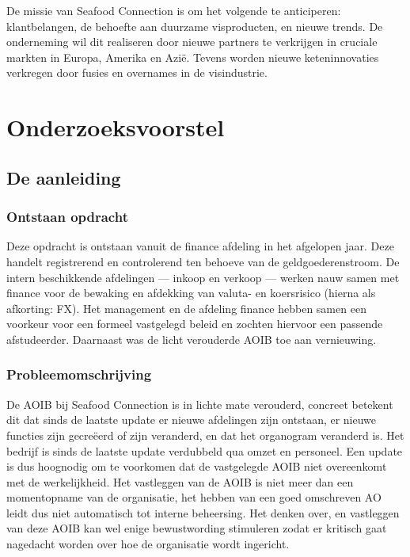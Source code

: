 \documentclass[10pt,a4paper,oneside]{report}
\begin{document}
De missie van Seafood Connection is om het volgende te anticiperen: klantbelangen, de behoefte aan duurzame visproducten, en nieuwe trends. De onderneming wil dit realiseren door nieuwe partners te verkrijgen in cruciale markten in Europa, Amerika en Azië. Tevens worden nieuwe keteninnovaties verkregen door fusies en overnames in de visindustrie. \citep{sfcwebsite}

\chapter{Onderzoeksvoorstel}
    \section{De aanleiding}

\subsection{Ontstaan opdracht}
Deze opdracht is ontstaan vanuit de finance afdeling in het afgelopen jaar. Deze handelt registrerend en controlerend ten behoeve van de geldgoederenstroom. De intern beschikkende afdelingen –-- inkoop en verkoop --– werken nauw samen met finance voor de bewaking en afdekking van valuta- en koersrisico (hierna als afkorting: FX). Het management en de afdeling finance hebben samen een voorkeur voor een formeel vastgelegd beleid en zochten hiervoor een passende afstudeerder. Daarnaast was de licht verouderde AOIB toe aan vernieuwing.

\subsection{Probleemomschrijving} \label{beschr:problemen}
De AOIB bij Seafood Connection is in lichte mate verouderd, concreet betekent dit dat sinds de laatste update er nieuwe afdelingen zijn ontstaan, er nieuwe functies zijn gecreëerd of zijn veranderd, en dat het organogram veranderd is. Het bedrijf is sinds de laatste update verdubbeld qua omzet en personeel. Een update is dus hoognodig om te voorkomen dat de vastgelegde AOIB niet overeenkomt met de werkelijkheid. 
Het vastleggen van de AOIB is niet meer dan een momentopname van de organisatie, het hebben van een goed omschreven AO leidt dus niet automatisch tot interne beheersing. Het denken over, en vastleggen van deze AOIB kan wel enige bewustwording stimuleren zodat er kritisch gaat nagedacht worden over hoe de organisatie wordt ingericht. \citep{bivpraktijk}
\end{document}
